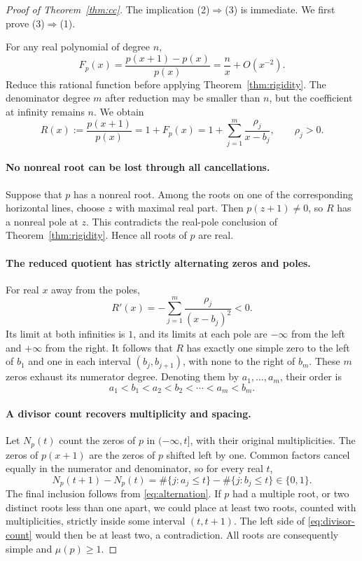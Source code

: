 \documentclass[11pt,a4paper]{article}
\theoremstyle{remark}
\begin{document}
\begin{proof}[Proof of Theorem~\ref{thm:cc}]
The implication (2)$\Rightarrow$(3) is immediate. We first prove
(3)$\Rightarrow$(1).

For any real polynomial of degree $n$,
\[
 F_p(x)=\frac{p(x+1)-p(x)}{p(x)}
       =\frac nx+O(x^{-2}).
\]
Reduce this rational function before applying
Theorem~\ref{thm:rigidity}. The denominator degree $m$ after reduction
may be smaller than $n$, but the coefficient at infinity remains $n$.
We obtain
\[
 R(x):=\frac{p(x+1)}{p(x)}=1+F_p(x)
 =1+\sum_{j=1}^m\frac{\rho_j}{x-b_j},\qquad \rho_j>0.
\]

\paragraph{No nonreal root can be lost through all cancellations.}
Suppose that $p$ has a nonreal root. Among the roots on one of the
corresponding horizontal lines, choose $z$ with maximal real part.
Then $p(z+1)\ne0$, so $R$ has a nonreal pole at $z$.
This contradicts the real-pole conclusion of
Theorem~\ref{thm:rigidity}. Hence all roots of $p$ are real.

\paragraph{The reduced quotient has strictly alternating zeros and poles.}
For real $x$ away from the poles,
\[
 R'(x)=-\sum_{j=1}^m\frac{\rho_j}{(x-b_j)^2}<0.
\]
Its limit at both infinities is $1$, and its limits at each pole
are $-\infty$ from the left and $+\infty$ from the right.
It follows that $R$ has exactly one simple zero to the left of $b_1$
and one in each interval $(b_j,b_{j+1})$, with none to the right of
$b_m$. These $m$ zeros exhaust its numerator degree. Denoting them
by $a_1,\ldots,a_m$, their order is
\begin{equation}\label{eq:alternation}
 a_1<b_1<a_2<b_2<\cdots<a_m<b_m.
\end{equation}

\paragraph{A divisor count recovers multiplicity and spacing.}
Let $N_p(t)$ count the zeros of $p$ in $(-\infty,t]$, with their
original multiplicities. The zeros of $p(x+1)$ are the zeros of $p$
shifted left by one. Common factors cancel equally in the numerator
and denominator, so for every real $t$,
\begin{equation}\label{eq:divisor-count}
 N_p(t+1)-N_p(t)
 =\#\{j:a_j\le t\}-\#\{j:b_j\le t\}\in\{0,1\}.
\end{equation}
The final inclusion follows from \eqref{eq:alternation}.
If $p$ had a multiple root, or two distinct roots less than one apart,
we could place at least two roots, counted with multiplicities,
strictly inside some interval $(t,t+1)$. The left side of
\eqref{eq:divisor-count} would then be at least two, a contradiction.
All roots are consequently simple and $\mu(p)\ge1$.


\end{proof}
\end{document}
